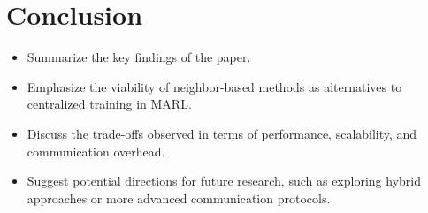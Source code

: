 \documentclass[sigconf]{acmart}
\begin{document}
\section{Conclusion}\label{sec:conclusion}
\begin{itemize}
\item Summarize the key findings of the paper.
\item Emphasize the viability of neighbor-based methods as alternatives to centralized training in MARL.
\item Discuss the trade-offs observed in terms of performance, scalability, and communication overhead.
\item Suggest potential directions for future research, such as exploring hybrid approaches or more advanced communication protocols.
\end{itemize}



 
\end{document}
